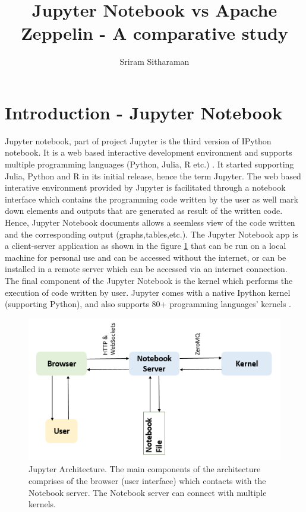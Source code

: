 \documentclass[9pt,twocolumn,twoside]{../../styles/osajnl}
\title{Jupyter Notebook vs Apache Zeppelin - A comparative study}
\author[1,*]{Sriram Sitharaman}
\affil[1]{School of Informatics and Computing, Bloomington, IN 47408, U.S.A.}
\affil[*]{Corresponding authors: srirsith@iu.edu}
\begin{document}
\maketitle
\tableofcontents %
\section{Introduction - Jupyter Notebook}
Jupyter notebook, part of project Jupyter is the third version of IPython notebook. It is a web based interactive development environment and supports multiple programming languages (Python, Julia, R etc.) \cite{www-jupyter-wiki}. It started supporting Julia, Python and R in its initial release, hence the term Jupyter. The web based interative environment provided by Jupyter is facilitated through a notebook interface which contains the programming code written by the user as well mark down elements and outputs that are generated as result of the written code\cite{www-jupyter-notebook}. Hence, Jupyter Notebook documents allows a seemless view of the code written and the corresponding output (graphs,tables,etc.). The Jupyter Notebook app is a client-server application as shown in the figure \ref{fig:arch} that can be run on a local machine for personal use and can be accessed without the internet, or can be installed in a remote server which can be accessed via an internet connection. The final component of the Jupyter Notebook is the kernel which performs the execution of code written by user. Jupyter comes with a native Ipython kernel (supporting Python), and also supports 80+ programming languages' kernels \cite{www-jupyter-kernel}.
\begin{figure}[h]
\begin{center}
\includegraphics[width =\linewidth,height=2.5in]{images/JupyterNotebook}
\caption{Jupyter Architecture. The main components of the  architecture  comprises of the browser (user interface) which contacts with the Notebook server. The Notebook server can connect with multiple kernels.\cite{www-jupyter-arch}}
\label{fig:arch}
\end{center}
\end{figure}
\end{document}
